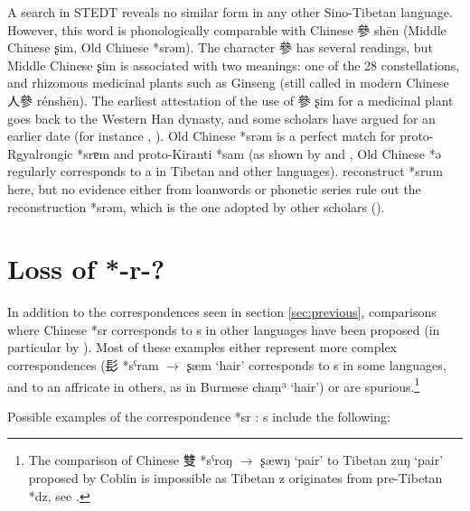 \documentclass[oldfontcommands,oneside,a4paper,11pt]{article}
\newcommand{\ipa}[1]{{\phon #1}} %
\newcommand{\zh}[1]{{\cn #1}}
\begin{document}
A search in STEDT reveals no similar form in any other Sino-Tibetan language. However, this word is phonologically comparable with Chinese \zh{參} \ipa{shēn} (Middle Chinese \ipa{ʂim}, Old Chinese *\ipa{srəm}). The character  \zh{參} has several readings, but Middle Chinese \ipa{ʂim} is associated with two meanings: one of the 28 constellations, and rhizomous medicinal plants such as Ginseng (still called in modern Chinese \zh{人參} \ipa{rénshēn}). The earliest attestation of the use of \zh{參} \ipa{ʂim} for a medicinal plant goes back to the Western Han dynasty, and some scholars have argued for an earlier date (for instance \citealt{xu11shen}, \citealt{sun92renshen}). Old Chinese *\ipa{srəm} is a perfect match for proto-Rgyalrongic *\ipa{srɐm} and proto-Kiranti *\ipa{sam} (as shown by \citealt{gong95st}and \citealt{hill12sixvowels}, Old Chinese *\ipa{ə} regularly corresponds to \ipa{a} in Tibetan and other languages). \citet{bs14oc} reconstruct *\ipa{srum} here, but no evidence either from loanwords or phonetic series rule out the reconstruction *\ipa{srəm}, which is the one adopted by other scholars (\citealt{schuessler06}).


\section{Loss of *-r-?}
In addition to the correspondences seen in section \ref{sec:previous}, comparisons where Chinese *\ipa{sr} corresponds to \ipa{s} in other languages have been proposed (in particular by \citealt{coblin86handlist}). Most of these examples either represent more complex correspondences (\zh{髟} *\ipa{sˁram} $\rightarrow$ \ipa{ʂæm} `hair' corresponds to \ipa{s} in some languages, and to an affricate in others, as in Burmese \ipa{chaṃ³} `hair') or are spurious.\footnote{The comparison of Chinese \zh{雙} *\ipa{sˁroŋ} $\rightarrow$ \ipa{ʂæwŋ} `pair' to Tibetan \ipa{zuŋ} `pair' proposed by Coblin is impossible as Tibetan \ipa{z} originates from pre-Tibetan *\ipa{dz}, see \citet{hill14dz}. }

Possible examples of the correspondence *\ipa{sr} : \ipa{s} include the following:
\end{document}
